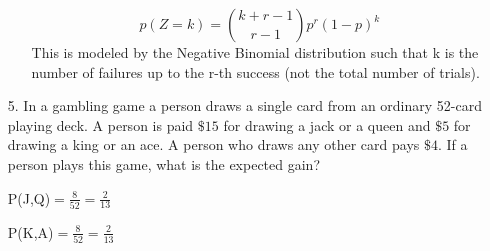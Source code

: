 \documentclass{article}
\begin{document}
\begin{enumerate}
\begin{enumerate}
\begin{equation*}
                p(Z=k)=\binom{k+r-1}{r-1}p^r(1-p)^{k}
            \end{equation*}
            This is modeled by the Negative Binomial distribution such that k is the number of failures up to the r-th success (not the total number of trials).
        \end{enumerate}
        \item[5.] In a gambling game a person draws a single card from an ordinary 52-card playing
deck. A person is paid $\$15$ for drawing a jack or a queen and $\$5$ for drawing a king or an ace. A person who draws any other card pays $\$4$. If a person plays this game, what is the expected gain?



        P(J,Q)$=\frac{8}{52}=\frac{2}{13}$
        
        P(K,A)$=\frac{8}{52}=\frac{2}{13}$
        

\end{enumerate}
\end{document}
